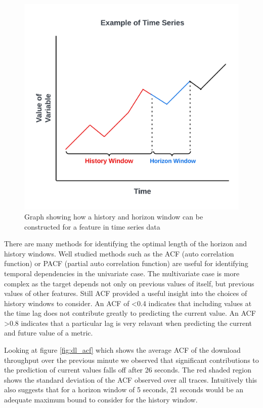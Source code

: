 \begin{figure}[h]
\includegraphics[scale=0.15]{History Horizon.png}
\centering
\caption{Graph showing how a history and horizon window can be constructed for a feature in time series data}
\label{fig:example_of_ts}
\end{figure}

There are many methods for identifying the optimal length of the horizon and history windows. Well studied methods such as the ACF (auto correlation function) or PACF (partial auto correlation function) \cite{10.2307/2958346} are useful for identifying temporal dependencies in the univariate case. The multivariate case is more complex as the target depends not only on previous values of itself, but previous values of other features. Still ACF provided a useful insight into the choices of history windows to consider. An ACF of <0.4 indicates that including values at the time lag does not contribute greatly to predicting the current value. An ACF >0.8 indicates that a particular lag is very relavant when predicting the current and future value of a metric.

Looking at figure \ref{fig:dl_acf} which shows the average ACF of the download throughput over the previous minute we observed that significant contributions to the prediction of current values falls off after 26 seconds. The red shaded region shows the standard deviation of the ACF observed over all traces. Intuitively this also suggests that for a horizon window of 5 seconds, 21 seconds would be an adequate maximum bound to consider for the history window. 


